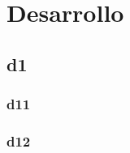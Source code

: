 \chapter{Desarrollo}
\thispagestyle{empty}

\section{d1}

\subsection{d11}


\newpage
\subsection{d12}